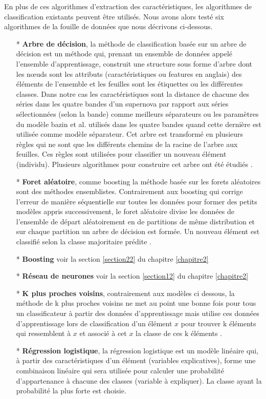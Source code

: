 \documentclass[french]{report}
\begin{document}
En plus de ces algorithmes d'extraction des caractéristiques, les algorithmes de classification existants peuvent être utilisés. Nous avons alors testé six algorithmes de la fouille de données que nous décrivons ci-dessous.
\begin{itemize}
	\item[*] \textbf{Arbre de décision}, la méthode de classification basée sur un arbre de décision est un méthode qui, prenant un ensemble de données appelé l'ensemble d'apprentissage, construit une structure sous forme d'arbre dont les nœuds sont les attributs (caractéristiques ou features en anglais) des éléments de l'ensemble et les feuilles sont les étiquettes ou les différentes classes. Dans notre cas les caractéristiques sont la distance de chacune des séries dans les quatre bandes d'un supernova par rapport aux séries sélectionnées (selon la bande) comme meilleurs séparateurs ou les paramètres du modèle bazin et al. utilisés dans les quatre bandes quand cette dernière est utilisée comme modèle séparateur. Cet arbre est transformé en plusieurs règles qui ne sont que les différents chemins de la racine de l'arbre aux feuilles. Ces règles sont utilisées pour classifier un nouveau élément (individu). Plusieurs algorithmes pour construire cet arbre ont été étudiés \cite{decisionTree}.
	\item[*] \textbf{Foret aléatoire}, comme boosting la méthode basée sur les forets aléatoires sont des méthodes ensemblistes. Contrairement aux boosting qui corrige l'erreur de manière séquentielle sur toutes les données pour former des petits modèles appris successivement, le foret aléatoire divise les données de l'ensemble de départ aléatoirement en de partitions de même distribution et sur chaque partition un arbre de décision est formée. Un nouveau élément est classifié selon la classe majoritaire prédite \cite{randomForest}.
	    
	\item[*] \textbf{Boosting} voir la section \ref{section22} du chapitre \ref{chapitre2} 
	\item[*] \textbf{Réseau de neurones} voir la section \ref{section12} du chapitre \ref{chapitre2}
	\item[*] \textbf{K plus proches voisins}, contrairement aux modèles ci dessous, la méthode de k plus proches voisins ne met au point une bonne fois pour tous un classificateur à partir des données d'apprentissage mais utilise ces données d'apprentissage lors de classification d'un élément $x$ pour trouver k éléments qui ressemblent à $x$ et associé à cet $x$ la classe de ces k éléments \cite {knn}. 
	\item[*] \textbf{Régression logistique}, la régression logistique \cite{rl} est un modèle linéaire qui, à partir des caractéristiques d'un élément (variables explicatives), forme une combinaison linéaire qui sera utilisée pour calculer une probabilité d'appartenance à chacune des classes (variable à expliquer). La classe ayant la probabilité la plus forte est choisie. 
\end{itemize}
\end{document}
